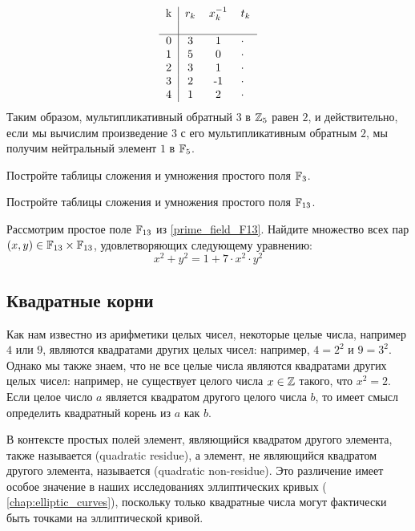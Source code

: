 \begin{example}
\begin{equation}
  \begin{tabular}{c | c c l}
    k & $ r_k $ & $ x^{-1}_k $ & $ t_k $ \\\\\hline
    0 & 3 & 1 & $\cdot$\ \\
    1 & 5 & 0 & $\cdot$ \\
    2 & 3 & 1 & $\cdot$ \\
    3 & 2 &-1 & $\cdot$ \\
    4 & 1 & 2  & $\cdot$ \\
  \end{tabular}
\end{equation}
Таким образом, мультипликативный обратный $3$ в $\mathbb{Z}_5$ равен $2$, и действительно, если мы вычислим произведение $3$ с его мультипликативным обратным $2$, мы получим нейтральный элемент $1$ в $\mathbb{F}_5$.
\end{example}
\begin{exercise}\label{exercise:F3} Постройте таблицы сложения и умножения простого поля $\mathbb{F}_3$.
\end{exercise}
\begin{exercise}\label{prime_field_F13} Постройте таблицы сложения и умножения простого поля $\mathbb{F}_{13}$.
\end{exercise}
\begin{exercise} Рассмотрим простое поле $\mathbb{F}_{13}$ из \exercisename{} \ref{prime_field_F13}. Найдите множество всех пар $(x,y)\in \mathbb{F}_{13}\times \mathbb{F}_{13}$, удовлетворяющих следующему уравнению:
\begin{equation}
x^2+y^2 = 1 + 7\cdot x^2\cdot y^2
\end{equation}
\end{exercise}
\subsection{Квадратные корни} Как нам известно из арифметики целых чисел, некоторые целые числа, например $4$ или $9$, являются квадратами других целых чисел: например, $4=2^2$ и $9=3^2$. Однако мы также знаем, что не все целые числа являются квадратами других целых чисел: например, не существует целого числа $x\in\mathbb{Z}$ такого, что $x^2=2$. Если целое число $a$ является квадратом другого целого числа $b$, то имеет смысл определить квадратный корень из $a$ как $b$.

В контексте простых полей элемент, являющийся квадратом другого элемента, также называется  (quadratic residue), а элемент, не являющийся квадратом другого элемента, называется  (quadratic non-residue). Это различение имеет особое значение в наших исследованиях эллиптических кривых (\chaptname{} \ref{chap:elliptic_curves}), поскольку только квадратные числа могут фактически быть точками на эллиптической кривой.

